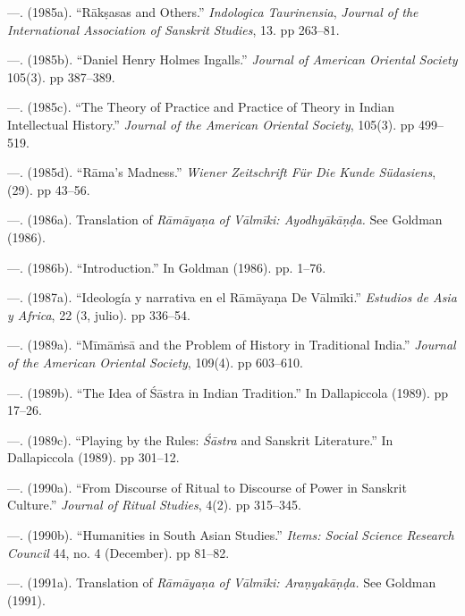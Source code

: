 \begin{thebibliography}{99}
 \item —. (1985a). “Rākṣasas and Others.” \textit{Indologica Taurinensia}, \textit{Journal of the International Association of Sanskrit Studies}, 13. pp 263–81.

 \item —. (1985b). “Daniel Henry Holmes Ingalls.” \textit{Journal of American Oriental Society }105(3). pp 387–389.

 \item —. (1985c). “The Theory of Practice and Practice of Theory in Indian Intellectual History.” \textit{Journal of the American Oriental Society}, 105(3). pp 499–519.

 \item —. (1985d). “Rāma’s Madness.” \textit{Wiener Zeitschrift Für Die Kunde Südasiens}, (29). pp 43–56.

 \item —. (1986a). Translation of \textit{Rāmāyaṇa of Vālmīki: Ayodhyākāṇḍa. }See Goldman (1986).

 \item —. (1986b). “Introduction.” In Goldman (1986). pp. 1–76.

 \item —. (1987a). “Ideología y narrativa en el Rāmāyaṇa De Vālmīki.” \textit{Estudios de Asia y Africa}, 22 (3, julio). pp 336–54.

 \item —. (1989a). “Mīmāṁsā and the Problem of History in Traditional India.” \textit{Journal of the American Oriental Society}, 109(4). pp 603–610.

 \item —. (1989b). “The Idea of Śāstra in Indian Tradition.” In Dallapiccola (1989). pp 17–26.

 \item —. (1989c). “Playing by the Rules: \textit{Śāstra} and Sanskrit Literature.” In Dallapiccola (1989). pp 301–12.

 \item —. (1990a). “From Discourse of Ritual to Discourse of Power in Sanskrit Culture.” \textit{Journal of Ritual Studies}, 4(2). pp 315–345.

 \item —. (1990b). “Humanities in South Asian Studies.” \textit{Items: Social Science Research Council} 44, no. 4 (December). pp 81–82.

 \item —. (1991a). Translation of \textit{Rāmāyaṇa of Vālmīki: Araṇyakāṇḍa. }See Goldman (1991).


\end{thebibliography}
